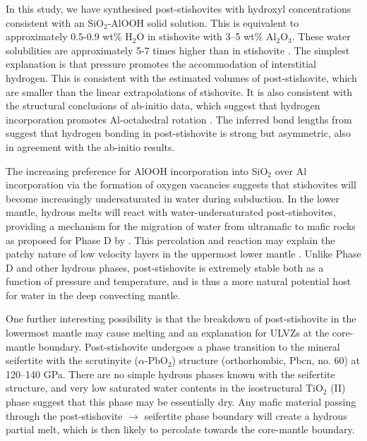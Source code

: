 \documentclass[review]{elsarticle}
\begin{document}
In this study, we have synthesised post-stishovites with hydroxyl concentrations consistent with an SiO$_2$-AlOOH solid solution. This is equivalent to approximately 0.5-0.9 wt\% H$_2$O in stishovite with 3--5 wt\% Al$_2$O$_3$. These water solubilities are approximately 5-7 times higher than in stishovite \citep{LKSOLBI2007, CK2002}. The simplest explanation is that pressure promotes the accommodation of interstitial hydrogen. This is consistent with the estimated volumes of post-stishovite, which are smaller than the linear extrapolations of stishovite. It is also consistent with the structural conclusions of ab-initio data, which suggest that hydrogen incorporation promotes Al-octahedral rotation \citep{PS2004}. The inferred bond lengths from \cite{Libowitzky1999} suggest that hydrogen bonding in post-stishovite is strong but asymmetric, also in agreement with the ab-initio results.

The increasing preference for AlOOH incorporation into SiO$_2$ over Al incorporation via the formation of oxygen vacancies suggests that stishovites will become increasingly undersaturated in water during subduction. In the lower mantle, hydrous melts will react with water-undersaturated post-stishovites, providing a mechanism for the migration of water from ultramafic to mafic rocks as proposed for Phase D by \cite{Pamatoetal2015}. This percolation and reaction may explain the patchy nature of low velocity layers in the uppermost lower mantle \citep{SJBLD2014}. Unlike Phase D and other hydrous phases, post-stishovite is extremely stable both as a function of pressure and temperature, and is thus a more natural potential host for water in the deep convecting mantle.


One further interesting possibility is that the breakdown of post-stishovite in the lowermost mantle may cause melting and an explanation for ULVZs at the core-mantle boundary. Post-stishovite undergoes a phase transition to the mineral seifertite with the scrutinyite ($\alpha$-PbO$_2$) structure (orthorhombic, Pbcn, no. 60) \citep{MHOO2003, GSP2013} at 120--140 GPa. There are no simple hydrous phases known with the seifertite structure, and very low saturated water contents in the isostructural TiO$_2$ (II) phase \citep{BHM2004} suggest that this phase may be essentially dry. Any mafic material passing through the post-stishovite $\rightarrow$ seifertite phase boundary will create a hydrous partial melt, which is then likely to percolate towards the core-mantle boundary.
\end{document}
